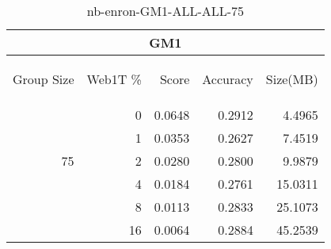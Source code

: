 \begin{center}
\begin{table}[htbp] 
 \begin{center}
\begin{tabular}{ | r | r | r | r | r |}
\hline
\multicolumn{5}{|c|}{GM1}\\
\hline
\begin{sideways}Group Size\end{sideways} & \begin{sideways}Web1T \%\end{sideways} & \begin{sideways}Score\end{sideways} & \begin{sideways}Accuracy\end{sideways} & \begin{sideways}Size(MB)\end{sideways}\\
\hline
\multirow{5}{*}{75}
 & 0 & 0.0648 & 0.2912 & 4.4965\\ \cline{2-5}
 & 1 & 0.0353 & 0.2627 & 7.4519\\ \cline{2-5}
 & 2 & 0.0280 & 0.2800 & 9.9879\\ \cline{2-5}
 & 4 & 0.0184 & 0.2761 & 15.0311\\ \cline{2-5}
 & 8 & 0.0113 & 0.2833 & 25.1073\\ \cline{2-5}
 & 16 & 0.0064 & 0.2884 & 45.2539\\ \cline{2-5}
\hline
\end{tabular}
\caption{nb-enron-GM1-ALL-ALL-75}
\label{table:nb-enron-GM1-ALL-ALL-75}
\end{center}
 \end{table}
\end{center}

